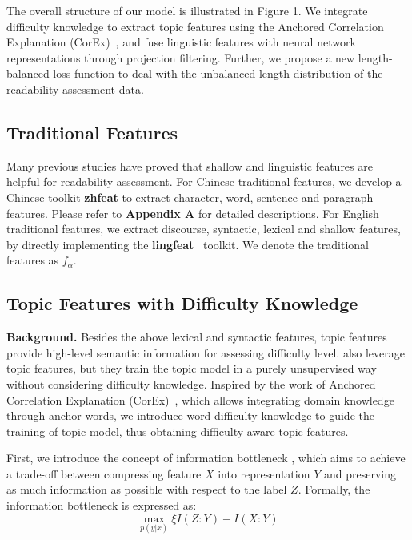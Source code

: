 \documentclass[11pt]{article}
\begin{document}
The overall structure of our model is illustrated in Figure 1. We integrate difficulty knowledge to extract topic features using the Anchored Correlation Explanation (CorEx)~\cite{gallagher2017anchored}, and fuse linguistic features with neural network representations through projection filtering.  
Further, we propose a new length-balanced loss function to deal with the unbalanced length distribution of the readability assessment data.


\subsection{Traditional Features}
Many previous studies have proved that shallow and linguistic features are helpful for readability assessment.
For Chinese traditional features, we develop a Chinese toolkit \textbf{zhfeat} to extract character, word, sentence and paragraph features. Please refer to \textbf{Appendix A} for detailed descriptions. For English traditional features, we extract discourse, syntactic, lexical and shallow features, by directly implementing the \textbf{lingfeat}~\cite{lee2021pushing} toolkit. We denote the traditional features as $f_\alpha$.


\subsection{Topic Features with Difficulty Knowledge}
\textbf{Background.} Besides the above lexical and syntactic features, topic features provide high-level semantic information for assessing difficulty level. \cite{lee2021pushing} also leverage topic features, but they train the topic model in a purely unsupervised way without considering difficulty knowledge. Inspired by the work of Anchored Correlation Explanation (CorEx)~\cite{gallagher2017anchored}, which allows integrating domain knowledge through anchor words, we introduce word difficulty knowledge to guide the training of topic model, thus obtaining difficulty-aware topic features.

First, we introduce the concept of information bottleneck \cite{tishby2000information}, which aims to achieve a trade-off between compressing feature $X$ into representation $Y$ and preserving as much information as possible with respect to the label $Z$. Formally, the information bottleneck is expressed as:
\begin{equation}
\mathop{max}\limits_{p(y|x)} \xi I(Z:Y) - I(X:Y)
\end{equation}
\end{document}
